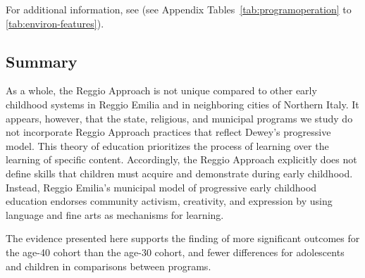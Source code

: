 For additional information, see (see Appendix Tables~\ref{tab:programoperation} to \ref{tab:environ-features}). 

\subsection{Summary}

As a whole, the Reggio Approach is not unique compared to other early childhood systems in Reggio Emilia and in neighboring cities of Northern Italy. It appears, however, that the state, religious, and municipal programs we study do not incorporate Reggio Approach practices that reflect Dewey's progressive model. This theory of education prioritizes the process of learning over the learning of specific content. Accordingly, the Reggio Approach explicitly does not define skills that children must acquire and demonstrate during early childhood. Instead, Reggio Emilia's municipal model of progressive early childhood education endorses community activism, creativity, and expression by using language and fine arts as mechanisms for learning. 

The evidence presented here supports the finding of more significant outcomes for the age-40 cohort than the age-30 cohort, and fewer differences for adolescents and children in comparisons between programs. 

